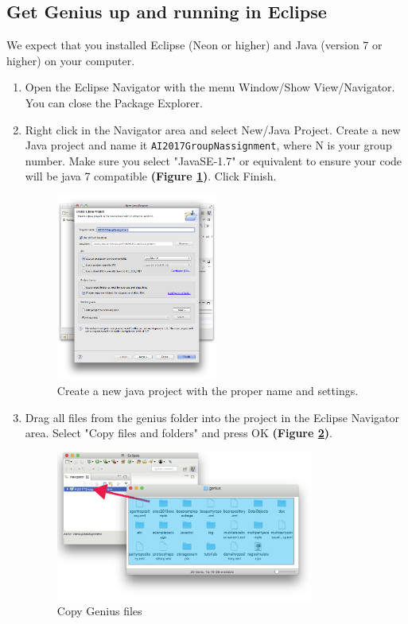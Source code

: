 \documentclass[]{article}
\begin{document}
\subsection{Get Genius up and running in Eclipse}
\label{sec:appendix-run-genius}
We expect that you installed Eclipse (Neon or higher) and Java (version 7 or higher) on your computer.
\begin{enumerate}

\item Open the Eclipse Navigator with the menu Window/Show View/Navigator. You can close the Package Explorer.

\item{Right click in the Navigator area and select New/Java Project. Create a new Java project and name it \texttt{AI2017GroupNassignment}, where N is your group number.} Make sure you select "JavaSE-1.7" or equivalent to ensure your code will be java 7 compatible \textbf{(Figure \ref{fig:run-genius-1})}. Click Finish.

\begin{figure}[h!]
	\centering
		\includegraphics[width=0.5\textwidth]{media/dialogNewJavaProject.png}
		\caption{Create a new java project with the proper name and settings.}
	\label{fig:run-genius-1}
\end{figure}

\item Drag all files from the genius folder into the project in the Eclipse Navigator area. Select "Copy files and folders" and press OK \textbf{(Figure \ref{fig:run-genius-2})}.

\begin{figure}[h!]
	\centering
		\includegraphics[width=0.8\textwidth]{media/dragdrop_generated.pdf}
		\caption{Copy Genius files}
	\label{fig:run-genius-2}
\end{figure}


\end{enumerate}
\end{document}
